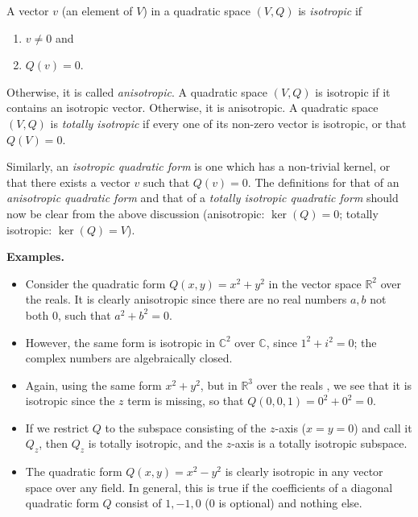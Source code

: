 \documentclass[12pt]{article}
\begin{document}
A vector $v$ (an element of $V$) in a quadratic space $(V,Q)$ is \emph{isotropic} if
\begin{enumerate}
\item $v\ne0$ and
\item $Q(v)=0$.
\end{enumerate}
Otherwise, it is called \emph{anisotropic}.  A quadratic space $(V,Q)$ is isotropic if it contains an isotropic vector.  Otherwise, it is anisotropic.  A quadratic space $(V,Q)$ is \emph{totally isotropic} if every one of its non-zero vector is isotropic, or that $Q(V)=0$.

Similarly, an \emph{isotropic quadratic form} is one which has a non-trivial kernel, or that there exists a vector $v$ such that $Q(v)=0$.  The definitions for that of an \emph{anisotropic quadratic form} and that of a \emph{totally isotropic quadratic form} should now be clear from the above discussion (anisotropic: $\operatorname{ker}(Q)=0$; totally isotropic: $\operatorname{ker}(Q)=V$).

\textbf{Examples.}
\begin{itemize}
\item Consider the quadratic form $Q(x,y)=x^2+y^2$ in the vector space $\mathbb{R}^2$ over the reals.  It is clearly anisotropic since there are no real numbers $a,b$ not both $0$, such that $a^2+b^2=0$.
\item However, the same form is isotropic in $\mathbb{C}^2$ over $\mathbb{C}$, since $1^2+i^2=0$; the complex numbers are algebraically closed.
\item Again, using the same form $x^2+y^2$, but in $\mathbb{R}^3$ over the reals , we see that it is isotropic since the $z$ term is missing, so that $Q(0,0,1)=0^2+0^2=0$.  
\item If we restrict $Q$ to the subspace consisting of the $z$-axis ($x=y=0$) and call it $Q_z$, then $Q_z$ is totally isotropic, and the $z$-axis is a totally isotropic subspace.
\item The quadratic form $Q(x,y)=x^2-y^2$ is clearly isotropic in any vector space over any field.  In general, this is true if the coefficients of a diagonal quadratic form $Q$ consist of $1, -1, 0$ ($0$ is optional) and nothing else.
\end{itemize}
\end{document}
